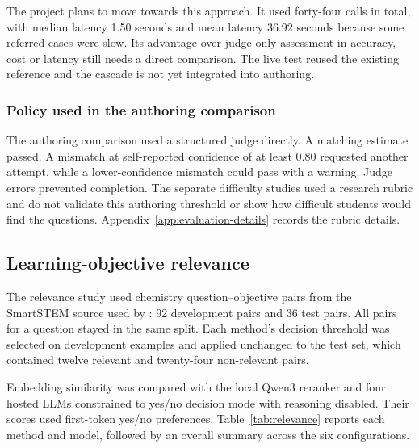 The project plans to move towards this approach. It used forty-four calls in total, with median latency 1.50 seconds and mean latency 36.92 seconds because some referred cases were slow. Its advantage over judge-only assessment in accuracy, cost or latency still needs a direct comparison. The live test reused the existing reference and the cascade is not yet integrated into authoring.

\subsubsection{Policy used in the authoring comparison}\label{sec:difficulty-policy}

The authoring comparison used a structured judge directly. A matching estimate passed. A mismatch at self-reported confidence of at least 0.80 requested another attempt, while a lower-confidence mismatch could pass with a warning. Judge errors prevented completion. The separate difficulty studies used a research rubric and do not validate this authoring threshold or show how difficult students would find the questions. Appendix~\ref{app:evaluation-details} records the rubric details.

\subsection{Learning-objective relevance}\label{sec:relevance-results}

The relevance study used chemistry question--objective pairs from the SmartSTEM source used by \textcite{zur2023}: 92 development pairs and 36 test pairs. All pairs for a question stayed in the same split. Each method's decision threshold was selected on development examples and applied unchanged to the test set, which contained twelve relevant and twenty-four non-relevant pairs.

Embedding similarity was compared with the local Qwen3 reranker and four hosted LLMs constrained to yes/no decision mode with reasoning disabled. Their scores used first-token yes/no preferences. Table~\ref{tab:relevance} reports each method and model, followed by an overall summary across the six configurations.


